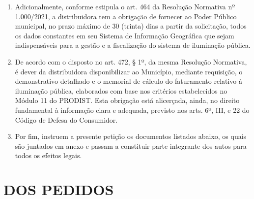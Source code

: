 \begin{enumerate}[resume]
{  Parágrafo único.  Recomenda-se a integração dos cadastros mantidos pelo poder público municipal com o sistema de informação geográfica da distribuidora.
  }
  \item Adicionalmente, conforme estipula o art. 464 da Resolução Normativa nº 1.000/2021, a distribuidora tem a obrigação de fornecer ao Poder Público municipal, no prazo máximo de 30 (trinta) dias a partir da solicitação, todos os dados constantes em seu Sistema de Informação Geográfica que sejam indispensáveis para a gestão e a fiscalização do sistema de iluminação pública.
  \item De acordo com o disposto no art. 472, § 1º, da mesma Resolução Normativa, é dever da distribuidora disponibilizar ao Município, mediante requisição, o demonstrativo detalhado e o memorial de cálculo do faturamento relativo à iluminação pública, elaborados com base nos critérios estabelecidos no Módulo 11 do PRODIST. Esta obrigação está alicerçada, ainda, no direito fundamental à informação clara e adequada, previsto nos arts. 6º, III, e 22 do Código de Defesa do Consumidor.
  \item Por fim, instruem a presente petição os documentos listados abaixo, os quais são juntados em anexo e passam a constituir parte integrante dos autos para todos os efeitos legais.
\end{enumerate}

\section{DOS PEDIDOS}

